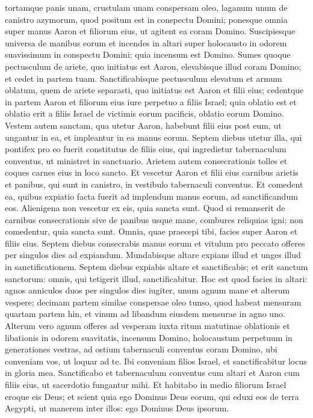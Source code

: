 \begin{biblechapter}
\verse tortamque panis unam, crustulam unam conspersam oleo, laganum unum de canistro azymorum, quod positum est in conspectu Domini; 
\verse ponesque omnia super manus Aaron et filiorum eius, ut agitent ea coram Domino. 
\verse Suscipiesque universa de manibus eorum et incendes in altari super holocausto in odorem suavissimum in conspectu Domini; quia incensum est Domino. 
\verse Sumes quoque pectusculum de ariete, quo initiatus est Aaron, elevabisque illud coram Domino; et cedet in partem tuam.  
\verse Sanctificabisque pectusculum elevatum et armum oblatum, quem de ariete separasti, 
\verse quo initiatus est Aaron et filii eius; cedentque in partem Aaron et filiorum eius iure perpetuo a filiis Israel; quia oblatio est et oblatio erit a filiis Israel de victimis eorum pacificis, oblatio eorum Domino. 
\verse Vestem autem sanctam, qua utetur Aaron, habebunt filii eius post eum, ut ungantur in ea, et impleantur in ea manus eorum. 
\verse Septem diebus utetur illa, qui pontifex pro eo fuerit constitutus de filiis eius, qui ingredietur tabernaculum conventus, ut ministret in sanctuario. 
\verse Arietem autem consecrationis tolles et coques carnes eius in loco sancto.  
\verse Et vescetur Aaron et filii eius carnibus arietis et panibus, qui sunt in canistro, in vestibulo tabernaculi conventus. 
\verse Et comedent ea, quibus expiatio facta fuerit ad implendum manus eorum, ad sanctificandum eos. Alienigena non vescetur ex eis, quia sancta sunt. 
\verse Quod si remanserit de carnibus consecrationis sive de panibus usque mane, combures reliquias igni; non comedentur, quia sancta sunt. 
\verse Omnia, quae praecepi tibi, facies super Aaron et filiis eius. Septem diebus consecrabis manus eorum 
\verse et vitulum pro peccato offeres per singulos dies ad expiandum. Mundabisque altare expians illud et unges illud in sanctificationem. 
\verse Septem diebus expiabis altare et sanctificabis; et erit sanctum sanctorum: omnis, qui tetigerit illud, sanctificabitur. 
\verse Hoc est quod facies in altari: agnos anniculos duos per singulos dies iugiter, 
\verse unum agnum mane et alterum vespere; 
\verse decimam partem similae conspersae oleo tunso, quod habeat mensuram quartam partem hin, et vinum ad libandum eiusdem mensurae in agno uno. 
\verse Alterum vero agnum offeres ad vesperam iuxta ritum matutinae oblationis et libationis in odorem suavitatis, incensum Domino, 
\verse holocaustum perpetuum in generationes vestras, ad ostium tabernaculi conventus coram Domino, ubi conveniam vos, ut loquar ad te. 
\verse Ibi conveniam filios Israel, et sanctificabitur locus in gloria mea. 
\verse Sanctificabo et tabernaculum conventus cum altari et Aaron cum filiis eius, ut sacerdotio fungantur mihi. 
\verse Et habitabo in medio filiorum Israel eroque eis Deus; 
\verse et scient quia ego Dominus Deus eorum, qui eduxi eos de terra Aegypti, ut manerem inter illos: ego Dominus Deus ipsorum. 
\end{biblechapter}

